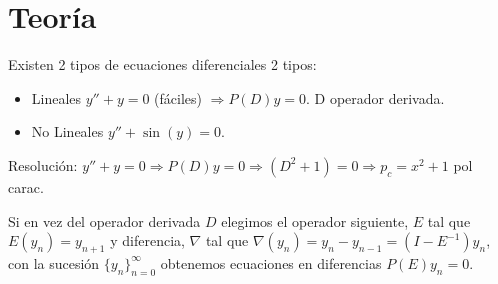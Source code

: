 \chapter{Teor\'ia} \justifying
Existen 2 tipos de ecuaciones diferenciales 2 tipos:
\begin{itemize}
    \item Lineales $y''+y=0$ (fáciles) $\Rightarrow P(D)y=0$. D operador derivada.
    \item No Lineales $y''+\sin(y)=0$.
\end{itemize}

Resolución: $y''+y=0 \Rightarrow P(D)y=0 \Rightarrow (D^2+1)=0 \Rightarrow p_c = x^2+1$ pol carac.

Si en vez del operador derivada $D$ elegimos el operador siguiente, $E$ tal que $E(y_n) = y_{n+1}$ y diferencia, $\nabla$ tal que $\nabla(y_n) = y_n - y_{n-1} = (I - E^{-1})y_n$, con la sucesión $\{y_n\}_{n=0}^{\infty}$ obtenemos ecuaciones en diferencias $P(E)y_n = 0$.

